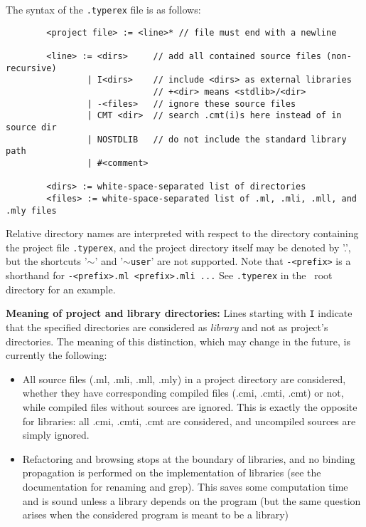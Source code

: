 The syntax of the \verb!.typerex! file is as follows:

{\verbsize\begin{verbatim}
        <project file> := <line>* // file must end with a newline

        <line> := <dirs>     // add all contained source files (non-recursive)
                | I<dirs>    // include <dirs> as external libraries
                             // +<dir> means <stdlib>/<dir>
                | -<files>   // ignore these source files
                | CMT <dir>  // search .cmt(i)s here instead of in source dir
                | NOSTDLIB   // do not include the standard library path
                | #<comment>

        <dirs> := white-space-separated list of directories
        <files> := white-space-separated list of .ml, .mli, .mll, and .mly files
\end{verbatim}}
\noindent Relative directory names are interpreted with respect to the
directory containing the project file \verb!.typerex!, and the project
directory itself may be denoted by '.', but the shortcuts '$\sim$' and
'$\sim$\verb!user!' are not supported. Note that \verb!-<prefix>! is a
shorthand for \verb!-<prefix>.ml <prefix>.mli ...! See \verb!.typerex! in
the \typerex\ root directory for an example.

{\bf Meaning of project and library directories:} Lines starting with
\verb!I! indicate that the specified directories are considered as
\emph{library} and not as project's directories. The meaning of this
distinction, which may change in the future, is currently the
following:
\begin{itemize}
\item All source files (.ml, .mli, .mll, .mly) in a project directory
  are considered, whether they have corresponding compiled files
  (.cmi, .cmti, .cmt) or not, while compiled files without sources are
  ignored. This is exactly the opposite for libraries: all .cmi,
  .cmti, .cmt are considered, and uncompiled sources are simply
  ignored.
\item Refactoring and browsing stops at the boundary of libraries, and
  no binding propagation is performed on the implementation of
  libraries (see the documentation for renaming and grep). This saves
  some computation time and is sound unless a library depends on the
  program (but the same question arises when the considered program is
  meant to be a library)
\end{itemize}

